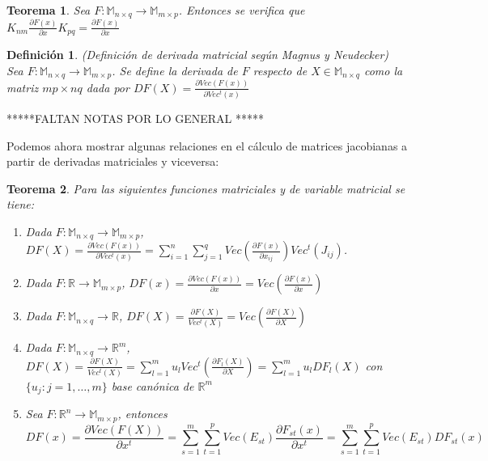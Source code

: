 \documentclass{article}
\theoremstyle{theorem-style}  %
\newtheorem{theorem}{Teorema}[section]  %
\theoremstyle{definition-style}
\newtheorem{definition}{Definición}[section]
\theoremstyle{example-style}
\theoremstyle{exercise-style}
\begin{document}
	\begin{theorem}
		\textit{Sea $F:\mathbb{M}_{n\times q}\rightarrow \mathbb{M}_{m\times p}$. Entonces se verifica que $K_{nm}\frac{\partial F(x)}{\partial x}K_{pq}= \frac{\partial F(x)}{\partial x}$}
	\end{theorem}
	
	\begin{definition}
		(Definición de derivada matricial según Magnus y Neudecker)\\
		Sea $F:\mathbb{M}_{n\times q}\rightarrow \mathbb{M}_{m\times p}$. Se define la derivada de $F$ respecto de $X\in \mathbb{M}_{n\times q}$ como la matriz $mp\times nq$ dada por \textbf{$DF(X)=\frac{\partial Vec(F(x))}{\partial Vec^t(x)}$}
	\end{definition}
	
	*****FALTAN NOTAS POR LO GENERAL *****
	
	Podemos ahora mostrar algunas relaciones en el cálculo de matrices jacobianas a partir de derivadas matriciales y viceversa:
	
	
	\begin{theorem}
		Para las siguientes funciones matriciales y de variable matricial se tiene:
		
		\begin{enumerate}
			\item Dada $F:\mathbb{M}_{n\times q} \rightarrow \mathbb{M}_{m \times p}$, $DF(X)=\frac{\partial Vec(F(x))}{\partial Vec^t(x)}=\sum_{i=1}^{n} \sum_{j=1}^{q} Vec(\frac{\partial F(x)}{\partial x_{ij}})Vec^t(J_{ij})$.
			
			\item Dada $F:\mathbb{R} \rightarrow \mathbb{M}_{m \times p}$, $DF(x)=\frac{\partial Vec(F(x))}{\partial x} = Vec(\frac{\partial F(x)}{\partial x})$ 
			
			\item Dada $F:\mathbb{M}_{n\times q} \rightarrow \mathbb{R}$, $DF(X)=\frac{\partial F(X)}{Vec^t(X)}=Vec(\frac{\partial F(X)}{\partial X})$
			
			\item  Dada $F:\mathbb{M}_{n\times q} \rightarrow \mathbb{R}^m$, $DF(X)=\frac{\partial F(X)}{Vec^t(X)} = \sum_{l=1}^{m} u_l Vec^t(\frac{\partial F_l(X)}{\partial X})=\sum_{l=1}^{m} u_l DF_l(X)$ con $\{u_j: j=1, \dots, m\}$ base canónica de $\mathbb{R}^m$
			
			\item Sea $F: \mathbb{R}^n \rightarrow \mathbb{M}_{m\times p} $, entonces 
			$$ DF(x)= \frac{\partial Vec(F(X))}{\partial x^t} = \sum_{s=1}^{m} \sum_{t=1}^{p} Vec(E_{st}) \frac{\partial F_{st}(x)}{\partial x^t} = \sum_{s=1}^{m} \sum_{t=1}^{p} Vec(E_{st}) DF_{st}(x)$$
			
			
		\end{enumerate}
	\end{theorem}
	
\end{document}
